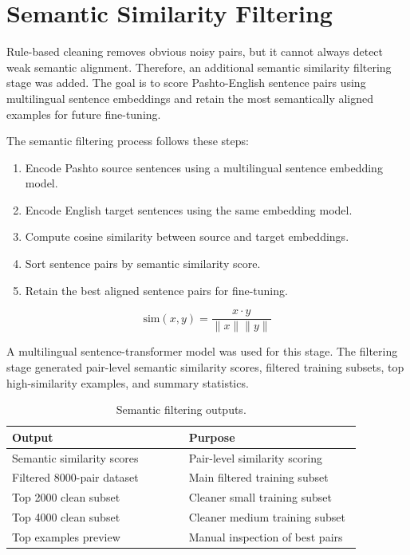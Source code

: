 \documentclass[conference]{IEEEtran}
\begin{document}
\section{Semantic Similarity Filtering}

Rule-based cleaning removes obvious noisy pairs, but it cannot always detect weak semantic alignment. Therefore, an additional semantic similarity filtering stage was added. The goal is to score Pashto-English sentence pairs using multilingual sentence embeddings and retain the most semantically aligned examples for future fine-tuning.

The semantic filtering process follows these steps:

\begin{enumerate}
    \item Encode Pashto source sentences using a multilingual sentence embedding model.
    \item Encode English target sentences using the same embedding model.
    \item Compute cosine similarity between source and target embeddings.
    \item Sort sentence pairs by semantic similarity score.
    \item Retain the best aligned sentence pairs for fine-tuning.
\end{enumerate}

\begin{equation}
\text{sim}(x,y)=\frac{x \cdot y}{\|x\|\|y\|}
\end{equation}

A multilingual sentence-transformer model was used for this stage. The filtering stage generated pair-level semantic similarity scores, filtered training subsets, top high-similarity examples, and summary statistics.

\begin{table}[H]
\centering
\caption{Semantic filtering outputs.}
\footnotesize
\begin{tabular}{p{0.44\linewidth}p{0.43\linewidth}}
\toprule
\textbf{Output} & \textbf{Purpose} \\
\midrule
Semantic similarity scores & Pair-level similarity scoring \\
Filtered 8000-pair dataset & Main filtered training subset \\
Top 2000 clean subset & Cleaner small training subset \\
Top 4000 clean subset & Cleaner medium training subset \\
Top examples preview & Manual inspection of best pairs \\
\bottomrule
\end{tabular}
\end{table}
\end{document}
